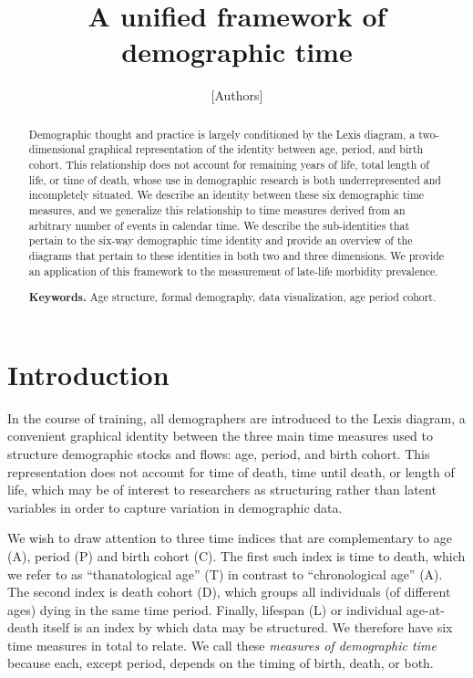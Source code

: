 \documentclass[12pt,oneside,a4paper,doublespacing]{article} %
\theoremstyle{definition}
\begin{document}
\title{A unified framework of demographic time}
\author{[Authors]}

\maketitle
\pagebreak
\begin{abstract}
Demographic thought and practice is largely conditioned by the Lexis diagram,
a two-dimensional graphical representation of the identity between age,
period, and birth cohort. This relationship does not account for remaining years
of life, total length of life, or time of death, whose use in
demographic research is both underrepresented and incompletely situated. We
describe an identity between these six demographic time measures, and
we generalize this relationship to time measures derived from an arbitrary
number of events in calendar time. We describe the sub-identities that pertain to the six-way
demographic time identity and provide an overview of the diagrams that pertain to
these identities in both two and three dimensions. We provide an application of
this framework to the measurement of late-life morbidity prevalence. 

\smallskip
\noindent \textbf{Keywords.} Age structure, formal demography, data
visualization, age period cohort.
\end{abstract}

\pagebreak

\section{Introduction}
In the course of training, all demographers are introduced
to the Lexis diagram, a convenient graphical identity between the three main
time measures used to structure demographic stocks and flows: age, period, and
birth cohort. This representation does not account for time of death, time until
death, or length of life, which may be of interest to researchers as structuring rather than latent variables in order to capture
variation in demographic data. 

We wish to draw attention to three time indices that are complementary to age
(A), period (P) and birth cohort (C). The first such index is time to death,
which we refer to as ``thanatological age'' (T) in contrast to ``chronological
age'' (A). The second index is death cohort (D), which groups all individuals
(of different ages) dying in the same time period. Finally, lifespan (L) or
individual age-at-death itself is an index by which data may be structured.
We therefore have six time measures in total to relate. We call these \emph{measures of demographic
time} because each, except period, depends on the timing of birth, death, or
both.
\end{document}
